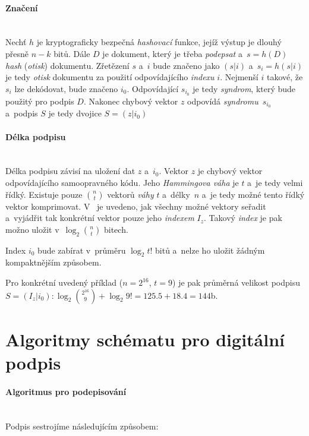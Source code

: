 \documentclass[thesis=M,czech,hidelinks]{FITthesis}[2012/06/26]
\newcommand{\0}{{\textcolor[gray]{0.75}{0}}}
\begin{document}
\paragraph{Značení} \hfil \\
Nechť $h$ je kryptograficky bezpečná \emph{hashovací} funkce, jejíž výstup je
dlouhý přesně $n-k$ bitů. Dále $D$ je dokument, který je třeba \emph{podepsat}
a~$ s = h\left(D\right)$ \emph{hash} (\emph{otisk}) dokumentu. Zřetězení $s$ a~$i$
bude značeno jako $(s|i)$ a~$s_i = h(s|i)$ je tedy \emph{otisk} dokumentu za
použití odpovídajícího \emph{indexu} $i$. Nejmenší $i$ takové, že $s_i$ lze
dekódovat, bude značeno $i_0$. Odpovídající $s_{i_0}$ je tedy \emph{syndrom},
který bude použitý pro podpis $D$. Nakonec chybový vektor $z$ odpovídá
\emph{syndromu}~$s_{i_0}$ a~podpis $S$ je tedy dvojice $S = ( z | i_0 )$


\paragraph{Délka podpisu} \hfil \\
Délka podpisu závisí na uložení dat $z$ a~$i_0$. Vektor $z$ je chybový vektor
odpovídajícího samoopravného kódu. Jeho \emph{Hammingova váha} je $t$ a~je tedy
velmi řídký. Existuje pouze $\binom{n}{t}$ vektorů \emph{váhy} $t$ a~délky~$n$
a~je tedy možné tento řídký vektor komprimovat. V~\cite{Courtois} je uvedeno,
jak všechny možné vektory seřadit a~vyjádřit tak konkrétní vektor pouze jeho
\emph{indexem} $I_z$. Takový \emph{index} je pak možno uložit
v~$\log_2{\binom{n}{t}}$ bitech.

Index $i_0$ bude zabírat v~průměru $\log_2{t!}$ bitů a~nelze ho uložit žádným
kompaktnějším způsobem.

Pro konkrétní uvedený příklad ($n=2^{16}$, $t=9$) je pak průměrná velikost
podpisu $S = ( I_z | i_0 ): \log_2{\binom{2^{16}}{9}} + \log_2{9!} =
125.5 + 18.4 = 144$\;b.



\section{Algoritmy schématu pro digitální podpis}


\paragraph{Algoritmus pro podepisování} \hfil \\
Podpis sestrojíme následujícím způsobem:
\end{document}
